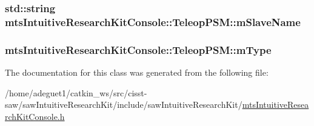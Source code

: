 \hypertarget{classmts_intuitive_research_kit_console_1_1_teleop_p_s_m_a4b8eb2520e536cf70180630b5a725fea}{
\subsubsection[{m\-Slave\-Name}]{\setlength{\rightskip}{0pt plus 5cm}std\-::string mts\-Intuitive\-Research\-Kit\-Console\-::\-Teleop\-P\-S\-M\-::m\-Slave\-Name\hspace{0.3cm}{\ttfamily [protected]}}}\label{classmts_intuitive_research_kit_console_1_1_teleop_p_s_m_a4b8eb2520e536cf70180630b5a725fea}
\hypertarget{classmts_intuitive_research_kit_console_1_1_teleop_p_s_m_aeca82c7ef619e84ffcdacca808264cdb}{
\subsubsection[{m\-Type}]{ mts\-Intuitive\-Research\-Kit\-Console\-::\-Teleop\-P\-S\-M\-::m\-Type\hspace{0.3cm}{\ttfamily [protected]}}}\label{classmts_intuitive_research_kit_console_1_1_teleop_p_s_m_aeca82c7ef619e84ffcdacca808264cdb}


The documentation for this class was generated from the following file\-:\begin{DoxyCompactItemize}
\item 
/home/adeguet1/catkin\-\_\-ws/src/cisst-\/saw/saw\-Intuitive\-Research\-Kit/include/saw\-Intuitive\-Research\-Kit/\hyperlink{mts_intuitive_research_kit_console_8h}{mts\-Intuitive\-Research\-Kit\-Console.\-h}\end{DoxyCompactItemize}
